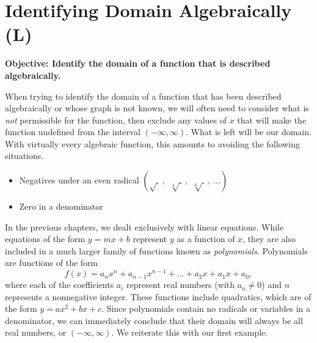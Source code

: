 \documentclass[12pt]{book}
\theoremstyle{definition}
\begin{document}
\section{Identifying Domain Algebraically (L)}
%
{\bf Objective: Identify the domain of a function that is described algebraically.}\par
When trying to identify the domain of a function that has been described algebraically or whose graph is not known, we will often need to consider what is {\it not} permissible for the function, then exclude any values of $x$ that will make the function undefined from the interval $(-\infty,\infty)$.  What is left will be our domain.  With virtually every algebraic function, this amounts to avoiding the following situations.
\begin{itemize}
	\item Negatives under an even radical $\left(\sqrt{~}~,~~\sqrt[4]{~}~,~~\sqrt[6]{~}~,~\ldots\right)$
	\item Zero in a denominator
\end{itemize}
In the previous chapters, we dealt exclusively with linear equations.  While equations of the form $y=mx+b$ represent $y$ as a function of $x$, they are also included in a much larger family of functions known as {\it polynomials}.  Polynomials are functions of the form $$f(x)=a_nx^n+a_{n-1}x^{n-1}+\ldots+a_2x+a_1x+a_0,$$ where each of the coefficients $a_i$ represent real numbers (with $a_n\neq 0$) and $n$ represents a nonnegative integer.  These functions include quadratics, which are of the form $y=ax^2+bx+c$.  Since polynomials contain no radicals or variables in a denominator, we can immediately conclude that their domain will always be all real numbers, or $(-\infty,\infty)$.  We reiterate this with our first example.
\end{document}
